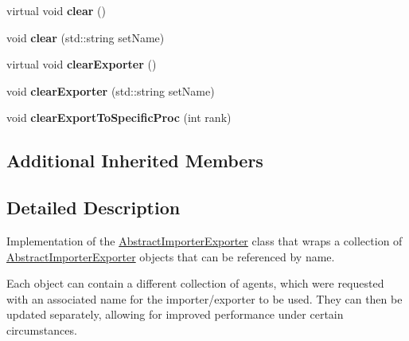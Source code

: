 \begin{DoxyCompactItemize}
\item 
\hypertarget{classrepast_1_1_importer_exporter___b_y___s_e_t_a3e197efc21efc60432241fbf60097fe9}{virtual void {\bfseries clear} ()}\label{classrepast_1_1_importer_exporter___b_y___s_e_t_a3e197efc21efc60432241fbf60097fe9}

\item 
\hypertarget{classrepast_1_1_importer_exporter___b_y___s_e_t_afdea331d16b4b0f6ef4083cbb33b34dc}{void {\bfseries clear} (std\-::string set\-Name)}\label{classrepast_1_1_importer_exporter___b_y___s_e_t_afdea331d16b4b0f6ef4083cbb33b34dc}

\item 
\hypertarget{classrepast_1_1_importer_exporter___b_y___s_e_t_ae6f7f705ff22c4675eccb8ba2730c753}{virtual void {\bfseries clear\-Exporter} ()}\label{classrepast_1_1_importer_exporter___b_y___s_e_t_ae6f7f705ff22c4675eccb8ba2730c753}

\item 
\hypertarget{classrepast_1_1_importer_exporter___b_y___s_e_t_a2bdbb566faa85117e101492a58e82f6d}{void {\bfseries clear\-Exporter} (std\-::string set\-Name)}\label{classrepast_1_1_importer_exporter___b_y___s_e_t_a2bdbb566faa85117e101492a58e82f6d}

\item 
\hypertarget{classrepast_1_1_importer_exporter___b_y___s_e_t_a099e4e82ac21783ec8740a84f1df44a9}{void {\bfseries clear\-Export\-To\-Specific\-Proc} (int rank)}\label{classrepast_1_1_importer_exporter___b_y___s_e_t_a099e4e82ac21783ec8740a84f1df44a9}

\end{DoxyCompactItemize}
\subsection*{Additional Inherited Members}


\subsection{Detailed Description}
Implementation of the \hyperlink{classrepast_1_1_abstract_importer_exporter}{Abstract\-Importer\-Exporter} class that wraps a collection of \hyperlink{classrepast_1_1_abstract_importer_exporter}{Abstract\-Importer\-Exporter} objects that can be referenced by name. 

Each object can contain a different collection of agents, which were requested with an associated name for the importer/exporter to be used. They can then be updated separately, allowing for improved performance under certain circumstances. 

